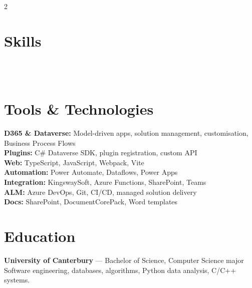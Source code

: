 \documentclass[lighthipster]{simplehipstercv}
\begin{document}
\begin{paracol}{2}
\vspace{1.5em}

\section*{Skills}

\noindent
{}\hfill
{}\hfill
{}\\[0.5em]
\hfill
{}\hfill
{}\\[0.5em]
\hfill
{}\hfill
{}

\vspace{1.5em}

\section*{Tools \& Technologies}

\noindent\textbf{D365 \& Dataverse:} Model-driven apps, solution management, customisation, Business Process Flows\\
\textbf{Plugins:} C\# Dataverse SDK, plugin registration, custom API\\
\textbf{Web:} TypeScript, JavaScript, Webpack, Vite\\
\textbf{Automation:} Power Automate, Dataflows, Power Apps\\
\textbf{Integration:} KingswaySoft, Azure Functions, SharePoint, Teams\\
\textbf{ALM:} Azure DevOps, Git, CI/CD, managed solution delivery\\
\textbf{Docs:} SharePoint, DocumentCorePack, Word templates

\vspace{1.5em}

\begin{minipage}[t]{0.48\textwidth}
\section*{Education}

\textbf{University of Canterbury} --- Bachelor of Science, Computer Science major\\
{\footnotesize\color{black!70} Software engineering, databases, algorithms, Python data analysis, C/C++ systems.}


\end{minipage}
\end{paracol}
\end{document}
